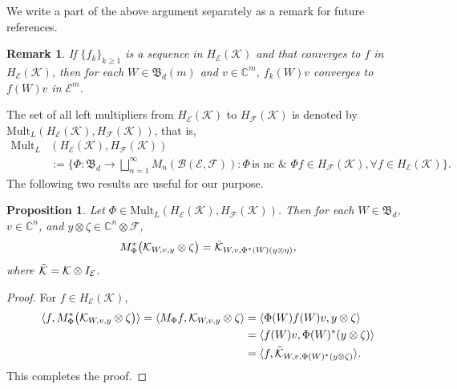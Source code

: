 \documentclass[12pt]{amsart}%
\newtheorem{proposition}[theorem]{Proposition}
\newtheorem{remark}[theorem]{Remark}
\numberwithin{equation}{section}
\newcommand{\fB}{{\mathfrak{B}}}
\newcommand{\clb}{\mathcal{B}}
\newcommand{\cle}{\mathcal{E}}
\newcommand{\clf}{\mathcal{F}}
\newcommand{\clk}{\mathcal{K}}
\newcommand{\C}{\mathbb{C}}
\begin{document}
We write a part of the above argument separately as a remark for future references.
\begin{remark}\label{Remark_f_n}
If $\{f_k\}_{k\geq 1}$ is a sequence in $H_\cle(\clk)$ and that converges to $f$ in $H_\cle(\clk)$, then for each $W\in \fB_d(m)$ and $v\in \C^m$, $f_k(W)v$ converges to $f(W)v$ in $\cle^m$.
\end{remark}

The set of all left multipliers from $H_\cle(\clk)$ to $H_\clf(\clk)$ is denoted by  $\text{Mult}_L(H_\cle(\clk), H_\clf(\clk))$, that is, 
\begin{align*}
\text{Mult}_L&(H_\cle(\clk), H_\clf(\clk))\\
&:=\Big \{\Phi: \fB_d \to \bigsqcup_{n=1}^\infty M_n(\clb(\cle, \clf)): \Phi \,\text{is nc}\,\, \& \,\,\Phi f\in H_\clf(\clk),  \forall f\in H_\cle(\clk) \Big \}.
\end{align*}
The following two results are useful for our purpose.
\begin{proposition}\label{action_adj_mul}
Let $\Phi\in \text{Mult}_L(H_\cle(\clk), H_\clf(\clk))$. Then for each $W\in \fB_d$, $v\in \C^n$, and $y\otimes \zeta\in \C^n\otimes \clf$,
\[
M^*_{\Phi} \big(\clk_{W, v, y}\otimes \zeta\big )= \Tilde{\clk}_{W, v, \Phi^*(W) (y\otimes\eta)},
\]
where $\Tilde{\clk}=\clk\otimes I_{\cle}$.
\end{proposition}
\begin{proof}
For $f\in H_\cle(\clk)$,
\begin{align*}
\langle f, M^*_{\Phi} \big(\clk_{W, v, y}\otimes \zeta\big)  \rangle=\langle M_\Phi f,  \clk_{W, v, y}\otimes \zeta \rangle &=\langle \Phi (W)f(W)v, y \otimes \zeta \rangle\\
&=\langle f(W)v, \Phi (W)^* (y\otimes\zeta) \rangle\\
&= \langle f,  \Tilde{\clk}_{W, v,\Phi(W)^* (y\otimes \zeta)} \rangle.
\end{align*}
This completes the proof.
\end{proof}
\end{document}
